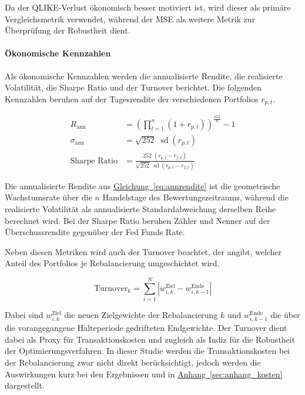 \documentclass[12pt,a4paper]{article}
\begin{document}
Da der QLIKE-Verlust ökonomisch besser motiviert ist, wird dieser als primäre Vergleichsmetrik verwendet, während der MSE als weitere Metrik zur Überprüfung der Robustheit dient.

\paragraph{Ökonomische Kennzahlen}
Als ökonomische Kennzahlen werden die annualisierte Rendite, die realisierte Volatilität, die Sharpe Ratio und der Turnover berichtet.
Die folgenden Kennzahlen beruhen auf der Tagesrendite der verschiedenen Portfolios $r_{p,t}$.

\begin{align}
	\label{eq:annrendite}
	R_{\mathrm{ann}} &= \left(\prod_{t=1}^{n}\left(1 + r_{p,t}\right)\right)^{\frac{252}{n}} - 1 \\
	\label{eq:annvola}
	\sigma_{\mathrm{ann}} &= \sqrt{252}\;\operatorname{sd}\left(r_{p,t}\right) \\
	\label{eq:sharpe}
	\text{Sharpe Ratio} &=\frac{252\;\overline{\left(r_{p,t} - r_{f,t}\right)}}{\sqrt{252}\;\operatorname{sd}\left(r_{p,t} - r_{f,t}\right)}
\end{align}

Die annualisierte Rendite aus \hyperref[eq:annrendite]{Gleichung~\ref*{eq:annrendite}} ist die geometrische Wachstumsrate über die $n$ Handelstage des Bewertungszeitraums, während die realisierte Volatilität als annualisierte Standardabweichung derselben Reihe berechnet wird.
Bei der Sharpe Ratio beruhen Zähler und Nenner auf der Überschussrendite gegenüber der Fed Funds Rate.

Neben diesen Metriken wird auch der Turnover beachtet, der angibt, welcher Anteil des Portfolios je Rebalancierung umgeschichtet wird.

\begin{equation}
	\mathrm{Turnover}_k = \sum_{i=1}^{N}\left| w_{i,k}^{\mathrm{Ziel}} - w_{i,k-1}^{\mathrm{Ende}} \right|
	\label{eq:turnover}
\end{equation}

Dabei sind $w_{i,k}^{\mathrm{Ziel}}$ die neuen Zielgewichte der Rebalancierung $k$ und $w_{i,k-1}^{\mathrm{Ende}}$ die über die vorangegangene Halteperiode gedrifteten Endgewichte.
Der Turnover dient dabei als Proxy für Transaktionskosten und zugleich als Indiz für die Robustheit der Optimierungsverfahren.
In dieser Studie werden die Transaktionskosten bei der Rebalancierung zwar nicht direkt berücksichtigt, jedoch werden die Auswirkungen kurz bei den Ergebnissen und in \hyperref[sec:anhang_kosten]{Anhang~\ref*{sec:anhang_kosten}} dargestellt.
\end{document}

